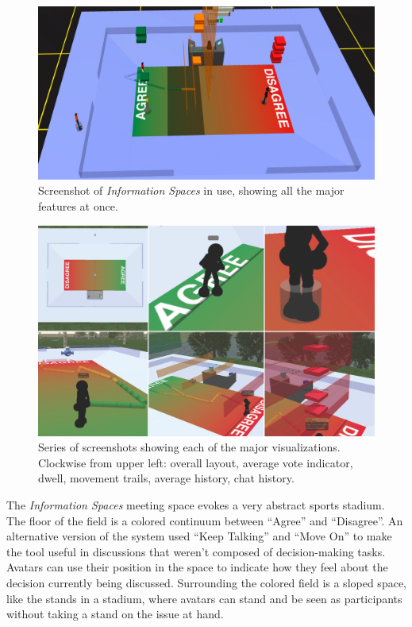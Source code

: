 \documentclass{tufte-handout}
\begin{document}
\begin{figure}[t]
	\includegraphics{figures/information-spaces-overview.png}
	\caption{Screenshot of \emph{Information Spaces} in use, showing all the major features at once.}
	\label{fig:information-spaces-overview}
\end{figure}

\begin{figure}[t]
	\includegraphics{figures/information-spaces-features.png}
	\caption{Series of screenshots showing each of the major visualizations. Clockwise from upper left: overall layout, average vote indicator, dwell, movement trails, average history, chat history.}
	\label{fig:information-spaces-features}
\end{figure}


The \emph{Information Spaces} meeting space evokes a very abstract sports stadium. The floor of the field is a colored continuum between ``Agree'' and ``Disagree''. An alternative version of the system used ``Keep Talking'' and ``Move On'' to make the tool useful in discussions that weren't composed of decision-making tasks. Avatars can use their position in the space to indicate how they feel about the decision currently being discussed. Surrounding the colored field is a sloped space, like the stands in a stadium, where avatars can stand and be seen as participants without taking a stand on the issue at hand.
\end{document}
